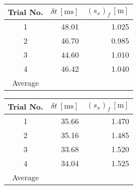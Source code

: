 \documentclass[a4paper]{article}
\begin{document}
\begin{figure}[h]
	\begin{minipage}{0.45\textwidth}
		\centering
		\begin{tabular}{crr}
			\toprule
			Trial No. & $\delta t \ [\si{\milli\second}]$ & $(s_x)_f \ [\si{\meter}]$\\
			\midrule
			1 & 48.01 & 1.025\\
			2 & 46.70 & 0.985\\
			3 & 44.60 & 1.010\\
			4 & 46.42 & 1.040\\
			\midrule
			Average & & \\
			\bottomrule
		\end{tabular}
	\end{minipage}
	\hspace{1cm}
	\begin{minipage}{0.45\textwidth}
		\centering
		\begin{tabular}{crr}
			\toprule
			Trial No. & $\delta t \ [\si{\milli\second}]$ & $(s_x)_f \ [\si{\meter}]$\\
			\midrule
			1 & 35.66 & 1.470\\
			2 & 35.16 & 1.485\\
			3 & 33.68 & 1.520\\
			4 & 34.04 & 1.525\\
			\midrule
			Average & & \\
			\bottomrule
		\end{tabular}
	\end{minipage}
\end{figure}
\end{document}
